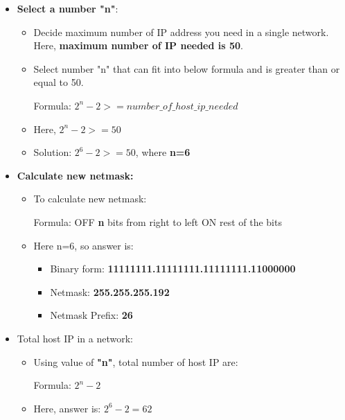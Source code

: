 \begin{flushleft}
\begin{itemize}
		\item \textbf{Select a number "n"}:
		\begin{itemize}
			\item Decide maximum number of IP address you need in a single network. Here, \textbf{maximum number of IP needed is 50}.
			\item Select number "n" that can fit into below formula and is greater than or equal to 50.
			\begin{tcolorbox}[breakable,notitle,boxrule=-0pt,colback=pink,colframe=pink]
				\color{black}
				Formula: $2^n-2 >= number\_of\_host\_ip\_needed$
				\font=4pt
			\end{tcolorbox}
			\item Here, $2^n-2 >= 50$
			\item Solution: $2^6-2 >= 50$, where \textbf{n=6}
		\end{itemize}
		\item \textbf{Calculate new netmask:}
		\begin{itemize}
			\item To calculate new netmask:
			\begin{tcolorbox}[breakable,notitle,boxrule=-0pt,colback=pink,colframe=pink]
				\color{black}
				Formula: 
				\newline
				OFF \textbf{n} bits from right to left
				\newline
				ON rest of the bits
				\font=4pt
			\end{tcolorbox}
			\item Here n=6, so answer is:
			\begin{itemize}
				\item Binary form: \textbf{11111111.11111111.11111111.11000000}
				\item Netmask: \textbf{255.255.255.192}
				\item Netmask Prefix: \textbf{26}
			\end{itemize}
		\end{itemize}
		\item Total host IP in a network:
		\begin{itemize}
			\item Using value of \textbf{"n"}, total number of host IP are:
			\begin{tcolorbox}[breakable,notitle,boxrule=-0pt,colback=pink,colframe=pink]
				\color{black}
				Formula: $2^n-2$
				\font=4pt
			\end{tcolorbox}
			\item Here, answer is: $2^6-2=62$

\end{itemize}
\end{itemize}
\end{flushleft}
